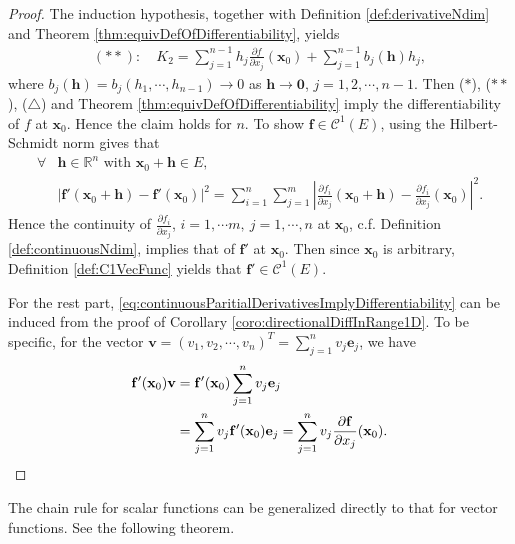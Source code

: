\begin{proof}
  The induction hypothesis, together with Definition
  \ref{def:derivativeNdim} and Theorem \ref{thm:equivDefOfDifferentiability},
  yields
  \begin{align*}
    (**):\quad
    K_{2}=\sum_{j=1}^{n-1}h_{j}\frac{\partial f}{\partial x_j}(\mathbf{x}_{0})
    +\sum_{j=1}^{n-1}b_{j}(\mathbf{h})h_{j},
  \end{align*}
  where $b_{j}(\mathbf{h})=b_{j}(h_{1},\cdots, h_{n-1})
  \rightarrow 0$ as $\mathbf{h}\rightarrow \mathbf{0}$,
  $j=1,2,\cdots, n-1$. Then ($*$), ($**$), ($\triangle$) and
  Theorem \ref{thm:equivDefOfDifferentiability} imply
  the differentiability of $f$ at $\mathbf{x}_{0}$.
  Hence the claim holds for $n$.
  To show $\mathbf{f}\in \mathcal{C}^{1}(E)$,
  using the Hilbert-Schmidt norm gives that
  \begin{align*}
    \forall &\mathbf{h}\in \mathbb{R}^{n}\text{ with }
    \mathbf{x}_{0}+\mathbf{h}\in E,\\
    &|\mathbf{f}'(\mathbf{x}_{0}+\mathbf{h})
    -\mathbf{f}'(\mathbf{x}_{0})|^{2}
    = \sum_{i=1}^{n}\sum_{j=1}^{m} \left|
    \frac{\partial f_{i}}{\partial x_{j}}(\mathbf{x}_{0}+\mathbf{h})
    -\frac{\partial f_{i}}{\partial x_{j}}(\mathbf{x}_{0})\right|^{2}.
  \end{align*}
  Hence the continuity of $\frac{\partial f_{i}}{\partial x_{j}}$,
  $i=1,\cdots m,\ j=1,\cdots, n$ at $\mathbf{x}_{0}$,
  c.f. Definition \ref{def:continuousNdim},
  implies that of $\mathbf{f}'$ at $\mathbf{x}_{0}$.
  Then since $\mathbf{x}_{0}$ is arbitrary,
  Definition \ref{def:C1VecFunc} yields that
  $\mathbf{f}'\in \mathcal{C}^{1}(E).$

  For the rest part,
  \eqref{eq:continuousParitialDerivativesImplyDifferentiability}
  can be induced from the proof of
  Corollary \ref{coro:directionalDiffInRange1D}.
  To be specific, for the vector
  $\mathbf{v}=(v_{1},v_{2},\cdots,v_{n})^{T}
  =\sum_{j=1}^{n}v_{j}\mathbf{e}_{j}$, we have
  \begin{align*}
    \mathbf{f}'(\mathbf{x}_{0})\mathbf{v}
    &=\mathbf{f}'(\mathbf{x}_{0})\sum_{j=1}^{n}v_{j}\mathbf{e}_{j}\\
    &=\sum_{j=1}^{n}v_{j}\mathbf{f}'(\mathbf{x}_{0})\mathbf{e}_{j}
    =\sum_{j=1}^{n}v_{j}\frac{\partial \mathbf{f}}{\partial x_{j}}
    (\mathbf{x}_{0}).\qedhere
  \end{align*}
\end{proof}

\begin{rem}
  The chain rule for scalar functions can be generalized directly to that
  for vector functions. See the following theorem.
\end{rem}

